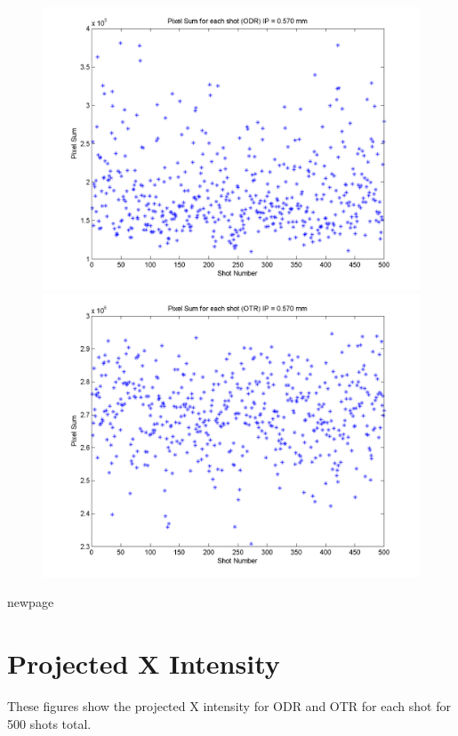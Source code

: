 \documentclass[12pt]{article}
\begin{document}
\begin{figure}
\begin{center}
\includegraphics[scale=0.5]{Figures/PixelSum_ODR_570.PNG}
\includegraphics[scale=0.5]{Figures/PixelSum_OTR_570.PNG}
\caption{}
\end{center}
\end{figure}



newpage

\section{Projected X Intensity}

These figures show the projected X intensity for ODR and OTR for each shot for 500 shots total.
\end{document}
